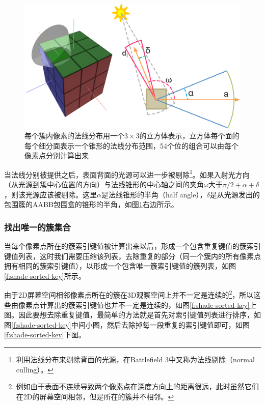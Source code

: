 \begin{figure}
\sidecaption
	\includegraphics[width=.65\textwidth]{figures/shade/normal-cone}
	\caption{每个簇内像素的法线分布用一个$3\times 3$的立方体表示，立方体每个面的每个细分面表示一个锥形的法线分布范围，54个位的组合可以由每个像素点分别计算出来}
	\label{f:shade-normal-cone}
\end{figure}

当法线分别被提供之后，表面背面的光源可以进一步被剔除\footnote{利用法线分布来剔除背面的光源，在Battlefield 3中又称为法线剔除（normal culling）。}。如果入射光方向（从光源到簇中心位置的方向）与法线锥形的中心轴之间的夹角$\omega$大于$\pi /2+\alpha+\delta$，则该光源应该被剔除。这里$\alpha$是法线锥形的半角（half angle），$\delta$是从光源发出的包围簇的AABB包围盒的锥形的半角，如图\ref{f:shade-normal-cone}右边所示。






\subsubsection{找出唯一的簇集合}
当每个像素点所在的簇索引键值被计算出来以后，形成一个包含重复键值的簇索引键值列表，这时我们需要压缩该列表，去除重复的部分（同一个簇内的所有像素点拥有相同的簇索引键值），以形成一个包含唯一簇索引键值的簇列表，如图\ref{f:shade-sorted-key}所示。

由于2D屏幕空间相邻像素点所在的簇在3D观察空间上并不一定是连续的\footnote{例如由于表面不连续导致两个像素点在深度方向上的距离很远，此时虽然它们在2D的屏幕空间相邻，但是所在的簇并不相邻。}，所以这些由像素点计算出的簇索引键值也并不一定是连续的，如图\ref{f:shade-sorted-key}上图。因此要想去除重复键值，最简单的方法就是首先对索引键值列表进行排序，如图\ref{f:shade-sorted-key}中间小图，然后去除掉每一段重复的索引键值即可，如图\ref{f:shade-sorted-key}下图。

